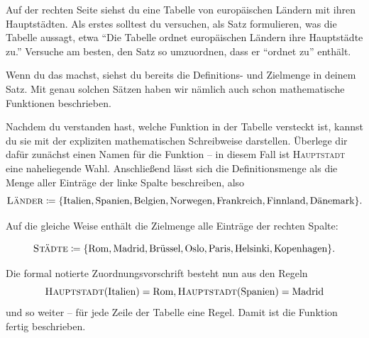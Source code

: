 \documentclass[../../main.tex]{subfiles}
\begin{document}
\begin{example}{}
    
    Auf der rechten Seite siehst du eine Tabelle von europäischen Ländern mit ihren Hauptstädten. Als erstes solltest du versuchen, als Satz formulieren, was die Tabelle aussagt, etwa \enquote{Die Tabelle ordnet europäischen Ländern ihre Hauptstädte zu.} Versuche am besten, den Satz so umzuordnen, dass er \enquote{ordnet zu} enthält.
    
    Wenn du das machst, siehst du bereits die Definitions- und Zielmenge in deinem Satz. Mit genau solchen Sätzen haben wir nämlich auch schon mathematische Funktionen beschrieben.
    
    Nachdem du verstanden hast, welche Funktion in der Tabelle versteckt ist, kannst du sie mit der expliziten mathematischen Schreibweise darstellen. Überlege dir dafür zunächst einen Namen für die Funktion -- in diesem Fall ist \textsc{Hauptstadt} eine naheliegende Wahl. Anschließend lässt sich die Definitionsmenge als die Menge aller Einträge der linke Spalte beschreiben, also
    \[\textsc{Länder}\coloneqq\{\text{Italien},\text{Spanien},\text{Belgien},\text{Norwegen},\text{Frankreich},\text{Finnland},\text{Dänemark}\}.\]
    
    Auf die gleiche Weise enthält die Zielmenge alle Einträge der rechten Spalte:
    
    \[\textsc{Städte}\coloneqq\{\text{Rom},\text{Madrid},\text{Brüssel},\text{Oslo},\text{Paris},\text{Helsinki},\text{Kopenhagen}\}.\]
    
    \sloppy
    Die formal notierte Zuordnungsvorschrift besteht nun aus den Regeln \[\textsc{Hauptstadt}(\text{Italien})=\text{Rom}, \textsc{Hauptstadt}(\text{Spanien})=\text{Madrid}\] und so weiter -- für jede Zeile der Tabelle eine Regel. Damit ist die Funktion fertig beschrieben.
    \fussy
\end{example}
\end{document}
